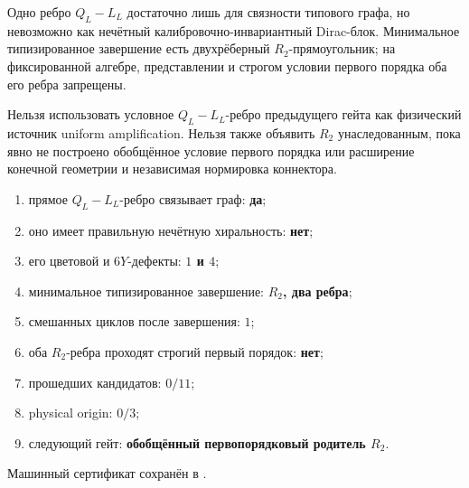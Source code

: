 \begin{theorem}
Одно ребро $Q_L-L_L$ достаточно лишь для связности типового графа, но
невозможно как нечётный калибровочно-инвариантный Dirac-блок. Минимальное
типизированное завершение есть двухрёберный $R_2$-прямоугольник; на
фиксированной алгебре, представлении и строгом условии первого порядка оба
его ребра запрещены.
\end{theorem}

\begin{nogocriterion}
Нельзя использовать условное $Q_L-L_L$-ребро предыдущего гейта как
физический источник uniform amplification. Нельзя также объявить $R_2$
унаследованным, пока явно не построено обобщённое условие первого порядка
или расширение конечной геометрии и независимая нормировка коннектора.
\end{nogocriterion}

\begin{protocol}\begin{enumerate}
\item прямое $Q_L-L_L$-ребро связывает граф: \textbf{да};
\item оно имеет правильную нечётную хиральность: \textbf{нет};
\item его цветовой и $6Y$-дефекты: \textbf{$1$ и $4$};
\item минимальное типизированное завершение: \textbf{$R_2$, два ребра};
\item смешанных циклов после завершения: \textbf{$1$};
\item оба $R_2$-ребра проходят строгий первый порядок: \textbf{нет};
\item прошедших кандидатов: \textbf{$0/11$};
\item physical origin: \textbf{$0/3$};
\item следующий гейт: \textbf{обобщённый первопорядковый родитель $R_2$}.
\end{enumerate}\end{protocol}

Машинный сертификат сохранён в
.